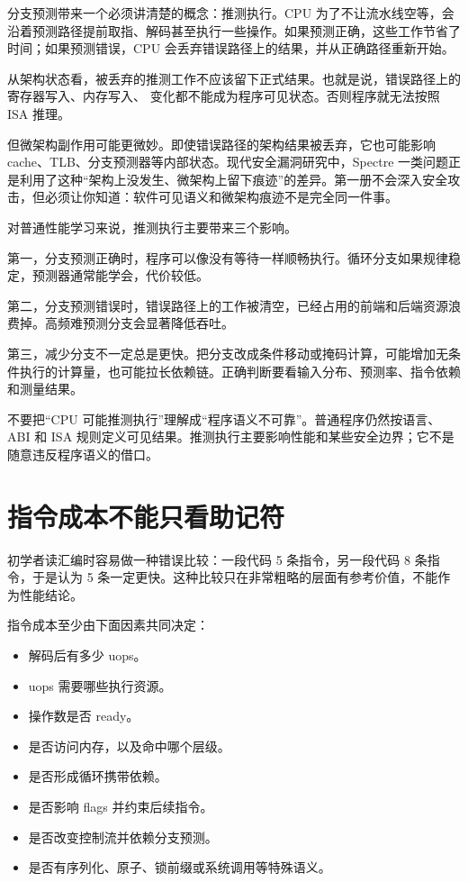 分支预测带来一个必须讲清楚的概念：推测执行。CPU 为了不让流水线空等，会沿着预测路径提前取指、解码甚至执行一些操作。如果预测正确，这些工作节省了时间；如果预测错误，CPU 会丢弃错误路径上的结果，并从正确路径重新开始。

从架构状态看，被丢弃的推测工作不应该留下正式结果。也就是说，错误路径上的寄存器写入、内存写入、 变化都不能成为程序可见状态。否则程序就无法按照 ISA 推理。

但微架构副作用可能更微妙。即使错误路径的架构结果被丢弃，它也可能影响 cache、TLB、分支预测器等内部状态。现代安全漏洞研究中，Spectre 一类问题正是利用了这种“架构上没发生、微架构上留下痕迹”的差异。第一册不会深入安全攻击，但必须让你知道：软件可见语义和微架构痕迹不是完全同一件事。

对普通性能学习来说，推测执行主要带来三个影响。

第一，分支预测正确时，程序可以像没有等待一样顺畅执行。循环分支如果规律稳定，预测器通常能学会，代价较低。

第二，分支预测错误时，错误路径上的工作被清空，已经占用的前端和后端资源浪费掉。高频难预测分支会显著降低吞吐。

第三，减少分支不一定总是更快。把分支改成条件移动或掩码计算，可能增加无条件执行的计算量，也可能拉长依赖链。正确判断要看输入分布、预测率、指令依赖和测量结果。

\begin{warningbox}
不要把“CPU 可能推测执行”理解成“程序语义不可靠”。普通程序仍然按语言、ABI 和 ISA 规则定义可见结果。推测执行主要影响性能和某些安全边界；它不是随意违反程序语义的借口。
\end{warningbox}

\section{指令成本不能只看助记符}

初学者读汇编时容易做一种错误比较：一段代码 5 条指令，另一段代码 8 条指令，于是认为 5 条一定更快。这种比较只在非常粗略的层面有参考价值，不能作为性能结论。

指令成本至少由下面因素共同决定：

\begin{itemize}
  \item 解码后有多少 uops。
  \item uops 需要哪些执行资源。
  \item 操作数是否 ready。
  \item 是否访问内存，以及命中哪个层级。
  \item 是否形成循环携带依赖。
  \item 是否影响 flags 并约束后续指令。
  \item 是否改变控制流并依赖分支预测。
  \item 是否有序列化、原子、锁前缀或系统调用等特殊语义。
\end{itemize}

